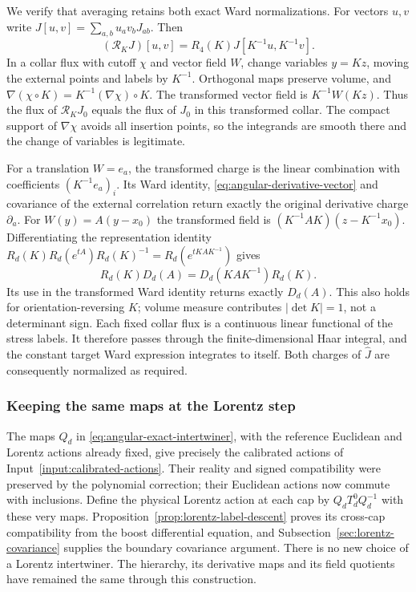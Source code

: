 We verify that averaging retains both exact Ward normalizations.
For vectors $u,v$ write $J[u,v]=\sum_{a,b}u_av_bJ_{ab}$. Then
\[
 (\mathcal R_KJ)[u,v]=R_4(K)J[K^{-1}u,K^{-1}v].
\]
In a collar flux with cutoff $\chi$ and vector field $W$, change variables
$y=Kz$, moving the external points and labels by $K^{-1}$. Orthogonal
maps preserve volume, and
$\nabla(\chi\circ K)=K^{-1}(\nabla\chi)\circ K$.
The transformed vector field is $K^{-1}W(Kz)$. Thus the flux of
$\mathcal R_KJ_0$ equals the flux of $J_0$ in this transformed collar.
The compact support of $\nabla\chi$ avoids all insertion points, so the
integrands are smooth there and the change of variables is legitimate.

For a translation $W=e_a$, the transformed charge is the linear
combination with coefficients $(K^{-1}e_a)_i$. Its Ward identity,
\eqref{eq:angular-derivative-vector} and covariance of the external
correlation return exactly the original derivative charge $\partial_a$.
For $W(y)=A(y-x_0)$ the transformed field is
$(K^{-1}AK)(z-K^{-1}x_0)$. Differentiating the representation identity
$R_d(K)R_d(e^{tA})R_d(K)^{-1}=R_d(e^{tKAK^{-1}})$ gives
\[
               R_d(K)D_d(A)=D_d(KAK^{-1})R_d(K).
\]
Its use in the transformed Ward identity returns exactly $D_d(A)$.
This also holds for orientation-reversing $K$; volume measure contributes
$|\det K|=1$, not a determinant sign. Each fixed collar flux is a
continuous linear functional of the stress labels. It therefore passes
through the finite-dimensional Haar integral, and the constant target
Ward expression integrates to itself. Both charges of $\widehat J$
are consequently normalized as required.

\subsubsection{Keeping the same maps at the Lorentz step}

The maps $Q_d$ in \eqref{eq:angular-exact-intertwiner}, with the reference
Euclidean and Lorentz actions already fixed, give precisely the calibrated
actions of Input~\ref{input:calibrated-actions}. Their reality and signed
compatibility were preserved by the polynomial correction; their
Euclidean actions now commute with inclusions. Define the physical
Lorentz action at each cap by $Q_dT_d^0Q_d^{-1}$ with these very maps.
Proposition~\ref{prop:lorentz-label-descent} proves its cross-cap
compatibility from the boost differential equation, and
Subsection~\ref{sec:lorentz-covariance} supplies the boundary covariance
argument. There is no new choice of a Lorentz intertwiner. The hierarchy,
its derivative maps and its field quotients have remained the same
through this construction.

